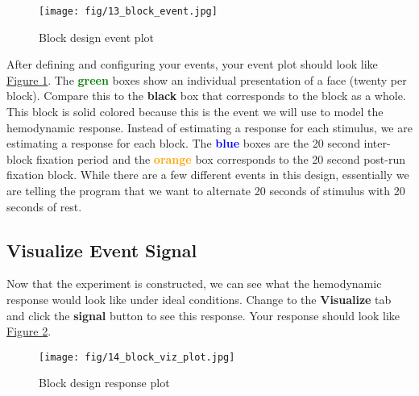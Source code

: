 \documentclass[10pt]{article}
\begin{document}
		\begin{figure}[ht]
			\centering
			\texttt{[image: fig/13\_block\_event.jpg]}
			\caption{Block design event plot}
			\label{fig:block_event_plot}
		\end{figure}
		After defining and configuring your events, your event plot should look like \hyperref[fig:block_event_plot]{Figure \ref{fig:block_event_plot}}.
		The \textcolor{green}{\textbf{green}} boxes show an individual presentation of a face (twenty per block).
		Compare this to the \textbf{black} box that corresponds to the block as a whole.
		This block is solid colored because this is the event we will use to model the hemodynamic response.
		Instead of estimating a response for each stimulus, we are estimating a response for each block.
		The \textcolor{blue}{\textbf{blue}} boxes are the 20 second inter-block fixation period and the \textcolor{orange}{\textbf{orange}} box corresponds to the 20 second post-run fixation block.
		While there are a few different events in this design, essentially we are telling the program that we want to alternate 20 seconds of stimulus with 20 seconds of rest.

	\subsection{Visualize Event Signal}
	\label{subsec:u3viz}
		Now that the experiment is constructed, we can see what the hemodynamic response would look like under ideal conditions.
		Change to the \textbf{Visualize} tab and click the \textbf{signal} button to see this response.
		Your response should look like \hyperref[fig:block_response_plot]{Figure \ref{fig:block_response_plot}}.
		\begin{figure}[ht]
			\centering
			\texttt{[image: fig/14\_block\_viz\_plot.jpg]}
			\caption{Block design response plot}
			\label{fig:block_response_plot}
		\end{figure}
	\newpage
\end{document}

